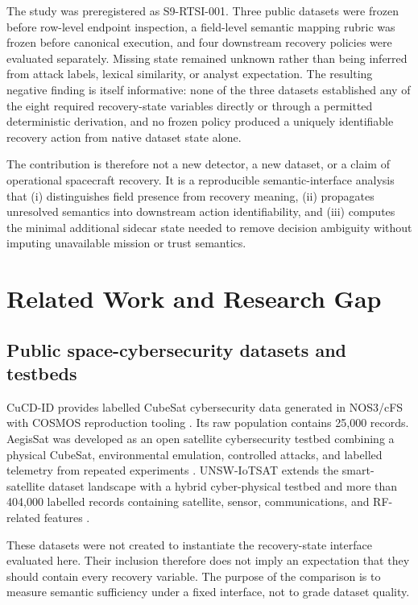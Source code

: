\documentclass[preprint,12pt]{elsarticle}
\begin{document}
The study was preregistered as S9-RTSI-001. Three public datasets were frozen before row-level endpoint inspection, a field-level semantic mapping rubric was frozen before canonical execution, and four downstream recovery policies were evaluated separately. Missing state remained unknown rather than being inferred from attack labels, lexical similarity, or analyst expectation. The resulting negative finding is itself informative: none of the three datasets established any of the eight required recovery-state variables directly or through a permitted deterministic derivation, and no frozen policy produced a uniquely identifiable recovery action from native dataset state alone.

The contribution is therefore not a new detector, a new dataset, or a claim of operational spacecraft recovery. It is a reproducible semantic-interface analysis that (i) distinguishes field presence from recovery meaning, (ii) propagates unresolved semantics into downstream action identifiability, and (iii) computes the minimal additional sidecar state needed to remove decision ambiguity without imputing unavailable mission or trust semantics.

\section{Related Work and Research Gap}

\subsection{Public space-cybersecurity datasets and testbeds}

CuCD-ID provides labelled CubeSat cybersecurity data generated in NOS3/cFS with COSMOS reproduction tooling \cite{fayyaz2026cucd}. Its raw population contains 25,000 records. AegisSat was developed as an open satellite cybersecurity testbed combining a physical CubeSat, environmental emulation, controlled attacks, and labelled telemetry from repeated experiments \cite{idan2025aegissat}. UNSW-IoTSAT extends the smart-satellite dataset landscape with a hybrid cyber-physical testbed and more than 404,000 labelled records containing satellite, sensor, communications, and RF-related features \cite{abdelhameed2026unsw}.

These datasets were not created to instantiate the recovery-state interface evaluated here. Their inclusion therefore does not imply an expectation that they should contain every recovery variable. The purpose of the comparison is to measure semantic sufficiency under a fixed interface, not to grade dataset quality.
\end{document}
